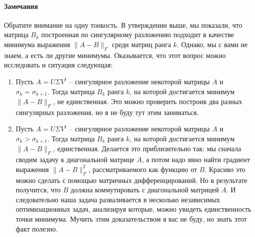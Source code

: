\paragraph{Замечания}

 Обратите внимание на одну тонкость.
 В утверждении выше, мы показали, что матрица $B_k$ построенная по сингулярному разложению подходит в качестве минимума выражения $\|A - B\|_F$ среди матриц ранга $k$.
 Однако, мы с вами не знаем, а есть ли другие минимумы.
 Оказывается, что этот вопрос можно исследовать и ситуация следующая:
\begin{enumerate}
\item Пусть $A = U \Sigma V^t$ -- сингулярное разложение некоторой матрицы $A$ и $\sigma_k = \sigma_{k+1}$.
Тогда матрица $B_k$ ранга $k$, на которой достигается минимум $\|A - B\|_F$, не единственная.
Это можно проверить построив два разных сингулярных разложения, но я не буду тут этим заниматься.

\item Пусть $A = U \Sigma V^t$ -- сингулярное разложение некоторой матрицы $A$ и $\sigma_k > \sigma_{k+1}$.
Тогда матрица $B_k$ ранга $k$, на которой достигается минимум $\|A - B\|_F$, единственная.
Делается это приблизительно так: мы сначала сводим задачу к диагональной матрице $A$, а потом надо явно найти градиент выражения $\|A - B\|_F^2$, рассматриваемого как функцию от $B$.
Красиво это можно сделать с помощью матричных дифференцирований.
Но в результате получится, что $B$ должна коммутировать с диагональной матрицей $A$.
И следовательно наша задача разваливается в несколько независимых оптимизационных задач, анализируя которые, можно увидеть единственность точки минимума.
Мучить этим доказательством я вас не буду, но знать этот факт полезно.
\end{enumerate}
